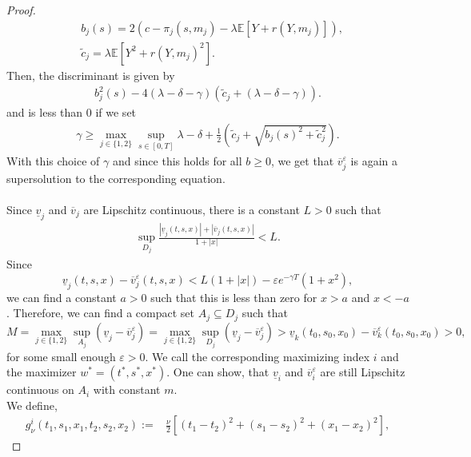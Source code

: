 \documentclass[a4paper]{scrartcl}
\theoremstyle{remark}
\theoremstyle{definition}
\numberwithin{equation}{section}
\begin{document}
\begin{proof}
\begin{align*}
    &b_j(s)=2(c-\pi_j(s,m_j)-\lambda\mathbb{E}[Y+r(Y,m_j)]),\\
    &\tilde{c}_j = \lambda\mathbb{E}[Y^2+r(Y,m_j)^2].
\end{align*}
Then, the discriminant is given by
\begin{align*}
    b_j^2(s)-4(\lambda-\delta - \gamma)(\tilde{c}_j+(\lambda-\delta - \gamma)).
\end{align*}
and is less than 0 if we set 
\begin{align*}
    \gamma\geq  \max_{j \in \{1,2\}}\sup_{s \in [0,T]}\lambda-\delta + \frac{1}{2}\left(\tilde{c}_j+\sqrt{b_j(s)^2+\tilde{c}_j^2}\right).
\end{align*}
With this choice of $\gamma$ and since this holds for all $b\geq0$, we get that $\overline{v}_j^\varepsilon$ is again a supersolution to the corresponding equation. \\ \ \\
    Since $\underline{v}_j$ and $\overline{v}_j$ are Lipschitz continuous, there is a constant $L>0$ such that 
    \begin{align}
    \label{proof:growthcondition}
        \sup_{D_j}\frac{|\underline{v}_j(t,s,x)|+|\overline{v}_j(t,s,x)|}{1+|x|}<L.
    \end{align}
    Since 
    \begin{equation*}
        \underline{v}_j(t,s,x)-\overline{v}^\varepsilon_j(t,s,x)<L(1+|x|)-\varepsilon e^{-\gamma T} (1+x^2),
    \end{equation*}
    we can find a constant $a>0$ such that this is less than zero for $x>a$ and $x<-a$. Therefore, we can find a compact set $A_j \subseteq D_j$ such that
    \begin{equation*}
        M = \max_{j \in \{1,2\}} \sup_{A_j}(\underline{v}_j-\overline{v}_j^\varepsilon)= \max_{j \in \{1,2\}}\sup_{D_j}(\underline{v}_j-\overline{v}_j^\varepsilon)> \underline{v}_k(t_0,s_0,x_0)-\overline{v}_k^\varepsilon(t_0,s_0,x_0)>0,
    \end{equation*}
    for some small enough $\varepsilon>0$. We call the corresponding maximizing index $i$ and the maximizer $w^*=(t^*,s^*,x^*)$. One can show, that $\underline{v}_i$ and $\overline{v}_i^\varepsilon$ are still Lipschitz continuous on $A_i$ with constant $m$. \\
    We define,
    \begin{align*}
        g_\nu^i(t_1,s_1,x_1,t_2,s_2,x_2):=&\frac{\nu}{2}\left[(t_1-t_2)^2+(s_1-s_2)^2+(x_1-x_2)^2\right],

\end{align*}
\end{proof}
\end{document}
